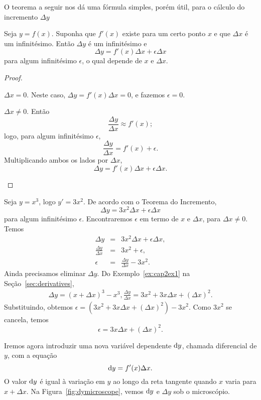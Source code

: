 O teorema a seguir nos dá uma fórmula simples, porém útil, para o cálculo
do incremento $\Delta y$

\begin{theorem}
Seja $y = f(x)$. Suponha que $f'(x)$ existe para um certo ponto $x$ e que
$\Delta x$ é um infinitésimo. Então $\Delta y$ é um infinitésimo e
$$
  \Delta y = f'(x) \Delta x + \epsilon \Delta x
$$
para algum infinitésimo $\epsilon$, o qual depende de $x$ e $\Delta x$.
\end{theorem}

\begin{proof}
\begin{caseanalysis}
\item $\Delta x = 0$. Neste caso, $\Delta y = f'(x) \Delta x = 0$, e fazemos
      $\epsilon = 0$.
\item $\Delta x \ne 0$. Então
$$
  \frac{\Delta y}{\Delta x} \approx f'(x);
$$
logo, para algum infinitésimo $\epsilon$,
$$
  \frac{\Delta y}{\Delta x} = f'(x) + \epsilon.
$$
Multiplicando ambos os lados por $\Delta x$,
$$
  \Delta y = f'(x) \Delta x + \epsilon \Delta x.
$$
\end{caseanalysis}
\end{proof}

\begin{example}
Seja $y = x^3$, logo $y' = 3x^2$. De acordo com o Teorema do Incremento,
$$
  \Delta y = 3x^2 \Delta x + \epsilon \Delta x
$$
para algum infinitésimo $\epsilon$. Encontraremos $\epsilon$ em termo de
$x$ e $\Delta x$, para $\Delta x \ne 0$. Temos
\begin{eqnarray*}
  \Delta y & = & 3x^2 \Delta x + \epsilon \Delta x, \\
  \frac{\Delta y}{\Delta x} & = & 3x^2 + \epsilon, \\
  \epsilon & = & \frac{\Delta y}{\Delta x} - 3x^2.
\end{eqnarray*}
Ainda precisamos eliminar $\Delta y$. Do Exemplo~\ref{ex:cap2ex1} na
Seção~\ref{sec:derivatives},
\begin{eqnarray*}
  \Delta y = (x + \Delta x)^3 - x^3,
  \frac{\Delta y}{\Delta x} = 3x^2 + 3x\Delta x + (\Delta x)^2.
\end{eqnarray*}
Substituindo, obtemos $\epsilon = (3x^2 + 3x\Delta x + (\Delta x)^2) - 3x^2$.
Como $3x^2$ se cancela, temos
$$
  \epsilon = 3x \Delta x + (\Delta x)^2.
$$
\end{example}

Iremos agora introduzir uma nova variável dependente $\dif y$, chamada
diferencial de $y$, com a equação
$$
  \dif y = f'(x) \Delta x.
$$
O valor $\dif y$ é igual à variação em $y$ ao longo da reta tangente quando
$x$ varia para $x + \Delta x$. Na Figura~\ref{fig:dymicroscope}, vemos
$\dif y$ e $\Delta y$ sob o microscópio.

